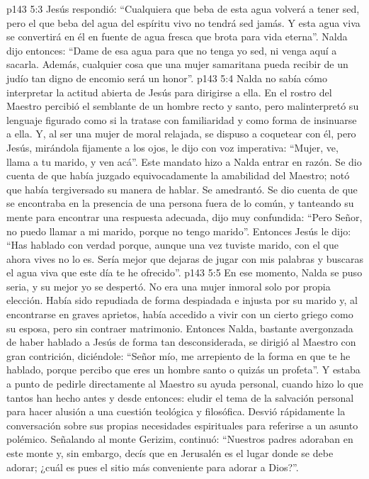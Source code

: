 \vs p143 5:3 Jesús respondió: “Cualquiera que beba de esta agua volverá a tener sed, pero el que beba del agua del espíritu vivo no tendrá sed jamás. Y esta agua viva se convertirá en él en fuente de agua fresca que brota para vida eterna”. Nalda dijo entonces: “Dame de esa agua para que no tenga yo sed, ni venga aquí a sacarla. Además, cualquier cosa que una mujer samaritana pueda recibir de un judío tan digno de encomio será un honor”.
\vs p143 5:4 Nalda no sabía cómo interpretar la actitud abierta de Jesús para dirigirse a ella. En el rostro del Maestro percibió el semblante de un hombre recto y santo, pero malinterpretó su lenguaje figurado como si la tratase con familiaridad y como forma de insinuarse a ella. Y, al ser una mujer de moral relajada, se dispuso a coquetear con él, pero Jesús, mirándola fijamente a los ojos, le dijo con voz imperativa: “Mujer, ve, llama a tu marido, y ven acá”. Este mandato hizo a Nalda entrar en razón. Se dio cuenta de que había juzgado equivocadamente la amabilidad del Maestro; notó que había tergiversado su manera de hablar. Se amedrantó. Se dio cuenta de que se encontraba en la presencia de una persona fuera de lo común, y tanteando su mente para encontrar una respuesta adecuada, dijo muy confundida: “Pero Señor, no puedo llamar a mi marido, porque no tengo marido”. Entonces Jesús le dijo: “Has hablado con verdad porque, aunque una vez tuviste marido, con el que ahora vives no lo es. Sería mejor que dejaras de jugar con mis palabras y buscaras el agua viva que este día te he ofrecido”.
\vs p143 5:5 En ese momento, Nalda se puso seria, y su mejor yo se despertó. No era una mujer inmoral solo por propia elección. Había sido repudiada de forma despiadada e injusta por su marido y, al encontrarse en graves aprietos, había accedido a vivir con un cierto griego como su esposa, pero sin contraer matrimonio. Entonces Nalda, bastante avergonzada de haber hablado a Jesús de forma tan desconsiderada, se dirigió al Maestro con gran contrición, diciéndole: “Señor mío, me arrepiento de la forma en que te he hablado, porque percibo que eres un hombre santo o quizás un profeta”. Y estaba a punto de pedirle directamente al Maestro su ayuda personal, cuando hizo lo que tantos han hecho antes y desde entonces: eludir el tema de la salvación personal para hacer alusión a una cuestión teológica y filosófica. Desvió rápidamente la conversación sobre sus propias necesidades espirituales para referirse a un asunto polémico. Señalando al monte Gerizim, continuó: “Nuestros padres adoraban en este monte y, sin embargo,  decís que en Jerusalén es el lugar donde se debe adorar; ¿cuál es pues el sitio más conveniente para adorar a Dios?”.
